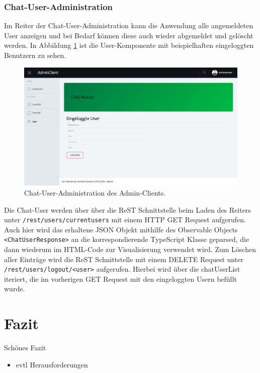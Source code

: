 \documentclass[10pt,journal,compsoc]{IEEEtran}
\begin{document}
\subsubsection{Chat-User-Administration}
Im Reiter der Chat-User-Administration kann die Anwendung alle angemeldeten User anzeigen und bei Bedarf können diese auch wieder abgemeldet und gelöscht werden. In Abbildung \ref{fig:adminClientUser} ist die User-Komponente mit beispielhaften eingeloggten Benutzern zu sehen.

\begin{figure}[h]
	\centering
	\includegraphics[scale=0.25]{Bilder/AdminClient_User.PNG}
	\caption{Chat-User-Administration des Admin-Clients.}
	\label{fig:adminClientUser}
\end{figure}

Die Chat-User werden über über die \ac{ReST} Schnittstelle beim Laden des Reiters unter \lstinline|/rest/users/currentusers| mit einem HTTP GET Request aufgerufen. Auch hier wird das erhaltene JSON Objekt mithilfe des Observable Objects \lstinline|<ChatUserResponse>| an die korrespondierende TypeScript Klasse geparsed, die dann wiederum im HTML-Code zur Visualisierung verwendet wird.
Zum Löschen aller Einträge wird die ReST Schnittstelle mit einem DELETE Request unter \lstinline|/rest/users/logout/<user>| aufgerufen. Hierbei wird über die chatUserList iteriert, die im vorherigen GET Request mit den eingeloggten Usern befüllt wurde.



\section{Fazit}
Schönes Fazit
\begin{itemize}
	\item evtl Herausforderungen
\end{itemize}
\end{document}
